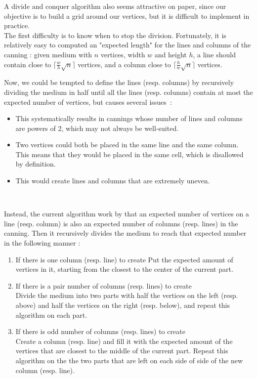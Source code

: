 \documentclass{report}
\begin{document}
A divide and conquer algorithm also seems attractive on paper, since our objective is to build a grid around our vertices, but it is difficult to implement in practice.\\

The first difficulty is to know when to stop the division. Fortunately, it is relatively easy to computed an "expected length" for the lines and columns of the canning : given medium with $n$ vertices, width $w$ and height $h$, a line should contain close to $\lceil\frac{w}{h}\sqrt{n}\rceil$ vertices, and a column close to $\lceil\frac{h}{w}\sqrt{n}\rceil$ vertices. 

Now, we could be tempted to define the lines (resp. columns) by recursively dividing the medium in half until all the lines (resp. columns) contain at most the expected number of vertices, but causes several issues~:
\begin{itemize}[noitemsep, nosep, label=-]
	\item This systematically results in cannings whose number of lines and columns are powers of 2, which may not always be well-suited.
	\item Two vertices could both be placed in the same line and the same column. This means that they would be placed in the same cell, which is disallowed by definition.
	\item This would create lines and columns that are extremely uneven. 
\end{itemize}$ $

Instead, the current algorithm work by that an expected number of vertices on a line (resp. column) is also an expected number of columns (resp. lines) in the canning. Then it recursively divides the medium to reach that expected number in the following manner :
\begin{enumerate}
	\item 
	If there is one column (resp. line) to create
	Put the expected amount of vertices in it, starting from the closest to the center of the current part.
	\item 
	If there is a pair number of columns (resp. lines) to create\\
	Divide the medium into two parts with half the vertices on the left (resp. above) and half the vertices on the right (resp. below), and repeat this algorithm on each part.
	\item 
	If there is odd number of columns (resp. lines) to create\\
	Create a column (resp. line) and fill it with the expected amount of the vertices that are closest to the middle of the current part.
	Repeat this algorithm on the the two parts that are left on each side of side of the new column (resp. line). 
\end{enumerate}$ $
\end{document}
